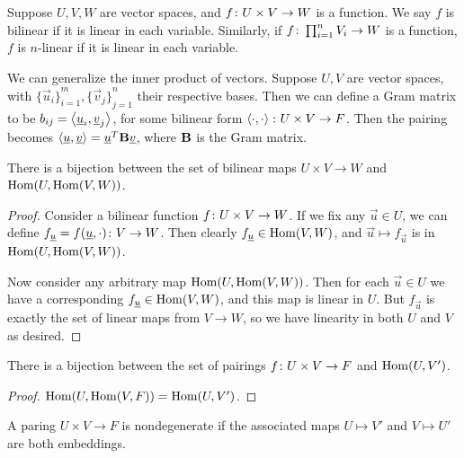 \begin{definition}
    Suppose \(U,V,W\) are vector spaces,
    and \(f\colon U \times V\to W\) is a function.
    We say \(f\) is bilinear if it is linear in each variable.
    Similarly, if \(f\colon\prod_{i=1}^n V_i\to W\) is a function,
    \(f\) is \(n\)-linear if it is linear in each variable.
\end{definition}
\begin{definition}
    We can generalize the inner product of vectors.
    Suppose \(U,V\) are vector spaces,
    with \({\{\vec{u}_i\}}_{i=1}^m,{\{\vec{v}_j\}}_{j=1}^n\) their respective bases.
    Then we can define a Gram matrix to be \(b_{ij} = \left\langle\underline{u}_i,\underline{v}_j\right\rangle\),
    for some bilinear form \(\left\langle\cdot,\cdot\right\rangle\colon U \times V\to F\).
    Then the pairing becomes \(\left\langle\underline{u},\underline{v}\right\rangle = \underline{u}^T \vb{B} \underline{v}\),
    where \(\vb{B}\) is the Gram matrix.
\end{definition}
\begin{theorem}
    There is a bijection between the set of bilinear maps \(U \times V \to W\)
    and \(\operatorname{Hom}(U,\operatorname{Hom}(V,W))\).
\end{theorem}
\begin{proof}
    Consider a bilinear function \(f\colon U \times V\to W\).
    If we fix any \(\vec{u} \in U\),
    we can define \(f_{\underline{u}} = f(\underline{u},\cdot)\colon V\to W\).
    Then clearly \(f_{\underline{u}} \in \operatorname{Hom}(V,W)\),
    and \(\vec{u} \mapsto f_{\vec{u}}\) is in \(\operatorname{Hom}(U,\operatorname{Hom}(V,W))\).

    Now consider any arbitrary map \(\operatorname{Hom}(U,\operatorname{Hom}(V,W))\).
    Then for each \(\vec{u} \in U\) we have a corresponding \(f_{\underline{u}} \in \operatorname{Hom}(V,W)\),
    and this map is linear in \(U\).
    But \(f_{\vec{u}}\) is exactly the set of linear maps from \(V \to W\),
    so we have linearity in both \(U\) and \(V\) as desired.
\end{proof}
\begin{corollary}\label{cor:bilinear-hom-bijection}
    There is a bijection between the set of pairings \(f\colon U \times V\to F\)
    and \(\operatorname{Hom}(U,V')\).
\end{corollary}
\begin{proof}
    \(\operatorname{Hom}(U,\operatorname{Hom}(V,F)) = \operatorname{Hom}(U,V')\).
\end{proof}
\begin{definition}
    A paring \(U \times V \to F\) is nondegenerate
    if the associated maps \(U \mapsto V'\) and \(V \mapsto U'\) are both embeddings.
\end{definition}

